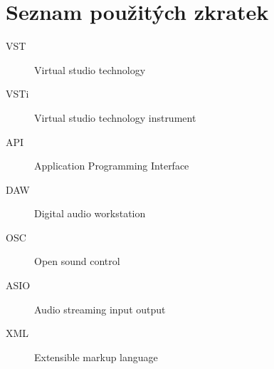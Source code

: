 \documentclass[thesis=M,czech]{FITthesis}[2019/03/06]
\begin{document}
\begin{conclusion}
\end{conclusion}




\appendix

\chapter{Seznam použitých zkratek}
\begin{description}
	\item[VST] Virtual studio technology
	\item[VSTi] Virtual studio technology instrument
	\item[API] Application Programming Interface
	\item[DAW] Digital audio workstation
	\item[OSC] Open sound control
	\item[ASIO] Audio streaming input output
	\item[XML] Extensible markup language
\end{description}
\end{document}
